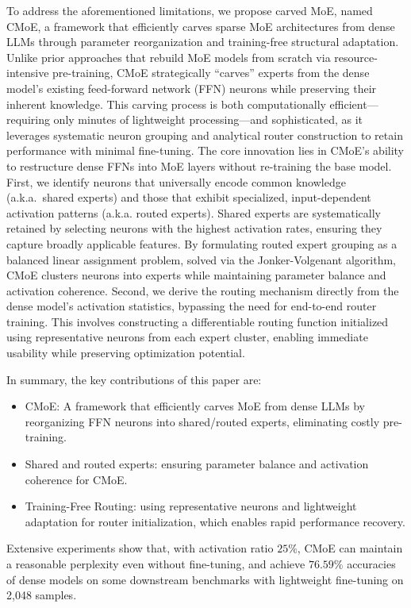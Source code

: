 To address the aforementioned limitations, we propose carved MoE, named CMoE,
a framework that efficiently carves sparse MoE architectures from dense LLMs through parameter reorganization and training-free structural adaptation. 
Unlike prior approaches that rebuild MoE models from scratch via resource-intensive pre-training,
CMoE strategically ``carves'' experts from the dense model’s existing feed-forward network (FFN) neurons while preserving their inherent knowledge. 
This carving process is both computationally efficient—requiring only minutes of lightweight processing—and sophisticated,
as it leverages systematic neuron grouping and analytical router construction to retain performance with minimal fine-tuning.
The core innovation lies in CMoE’s ability to restructure dense FFNs into MoE layers without re-training the base model. 
First, we identify neurons that universally encode common knowledge (a.k.a.~shared experts) and those that exhibit specialized, input-dependent activation patterns (a.k.a. routed experts).
Shared experts are systematically retained by selecting neurons with the highest activation rates, ensuring they capture broadly applicable features.
By formulating routed expert grouping as a balanced linear assignment problem, solved via the Jonker-Volgenant algorithm,
CMoE clusters neurons into experts while maintaining parameter balance and activation coherence. 
Second, we derive the routing mechanism directly from the dense model’s activation statistics, bypassing the need for end-to-end router training.
This involves constructing a differentiable routing function initialized using representative neurons from each expert cluster,
enabling immediate usability while preserving optimization potential.

In summary, the key contributions of this paper are:
\begin{itemize}
    \item CMoE: A framework that efficiently carves MoE from dense LLMs by reorganizing FFN neurons into shared/routed experts, eliminating costly pre-training.
    \item Shared and routed experts: ensuring parameter balance and activation coherence for CMoE.
    \item Training-Free Routing: using representative neurons and lightweight adaptation for router initialization, which enables rapid performance recovery.

\end{itemize}

Extensive experiments show that, with activation ratio $25\%$, CMoE can maintain a reasonable perplexity even without fine-tuning, and achieve $76.59\%$ accuracies of dense models on some downstream benchmarks with lightweight fine-tuning on 2,048 samples.



